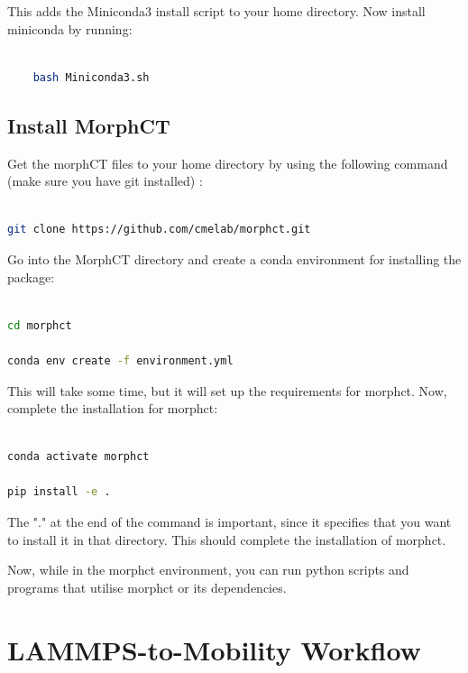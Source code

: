 \documentclass{article}
\begin{document}
This adds the Miniconda3 install script to your home directory. Now install miniconda by running:

\begin{lstlisting}[language=bash]

    bash Miniconda3.sh

\end{lstlisting}

\subsection{Install MorphCT}

Get the morphCT files to your home directory by using the following command (make sure you have git installed) :

\begin{lstlisting}[language=bash]

git clone https://github.com/cmelab/morphct.git

\end{lstlisting}

Go into the MorphCT directory and create a conda environment for installing the package:

\begin{lstlisting}[language=bash]

cd morphct

conda env create -f environment.yml

\end{lstlisting}

This will take some time, but it will set up the requirements for morphct. Now, complete the installation for morphct:

\begin{lstlisting}[language=bash]

conda activate morphct

pip install -e .

\end{lstlisting}

The "." at the end of the command is important, since it specifies that you want to install it in that directory. This should complete the installation of morphct.

Now, while in the morphct environment, you can run python scripts and programs that utilise morphct or its dependencies.

\section{LAMMPS-to-Mobility Workflow}
\end{document}
